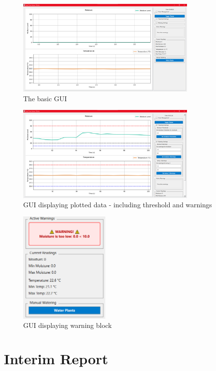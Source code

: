\documentclass[a4paper,11pt]{article}
\begin{document}
\begin{figure}[H]
    \centering
    \includegraphics[width=0.8\textwidth]{2 - Blank Chart.png}
    \caption{The basic GUI}
    \label{fig:blank_gui}
\end{figure}

\begin{figure}[H]
    \centering
    \includegraphics[width=0.8\textwidth]{3 - Threshold Setting.png}
    \caption{GUI displaying plotted data - including threshold and warnings}
    \label{fig:plotted}
\end{figure}

\begin{figure}[H]
    \centering
    \includegraphics[width=0.4\textwidth]{4 - Warning.png}
    \caption{GUI displaying warning block}
    \label{fig:warning_block}
\end{figure}

\section{Interim Report}
\end{document}

